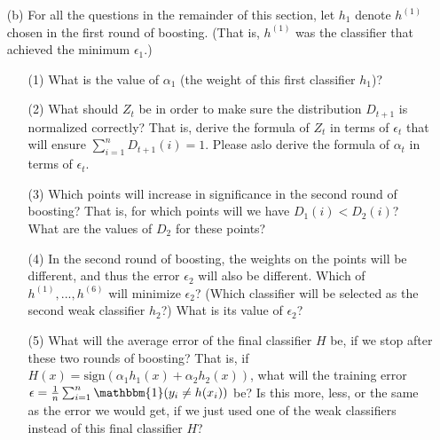 \documentclass[10pt]{article}
\begin{document}
\begin{enumerate}
\begin{itemize}
	        \item[(b)] For all the questions in the remainder of this section, let $h_{1}$ denote $h^{(1)}$ chosen in the first round of boosting. (That is, $h^{(1)}$ was the classifier that achieved the minimum $\epsilon_{1}$.)
		        \begin{enumerate}
			        \item[(1)] What is the value of $\alpha_{1}$ (the weight of this first classifier $h_{1}$)? ~\\

			        \item[(2)] What should $Z_{t}$ be in order to make sure the distribution $D_{t+1}$ is normalized correctly? That is, derive the formula of $Z_{t}$ in terms of $\epsilon_{t}$ that will ensure $\sum_{i=1}^{n} D_{t+1}(i) = 1$. Please aslo derive the formula of $\alpha_{t}$ in terms of $\epsilon_{t}$. ~\\

			        \item[(3)] Which points will increase in significance in the second round of boosting? That is, for which points will we have $D_{1}(i) < D_{2}(i)$? What are the values of $D_{2}$ for these points?~\\

			        \item[(4)] In the second round of boosting, the weights on the points will be different, and thus the error $\epsilon_2$ will also be different. Which of $h^{(1)}, . . . , h^{(6)}$ will minimize $\epsilon_2$? (Which classifier will be selected as the second weak classifier $h_2$?) What is its value of $\epsilon_2$?~\\

			        \item[(5)] What will the average error of the final classifier $H$ be, if we stop after these two rounds of boosting? That is, if $H(x) = \text{sign}(\alpha_{1}h_{1}(x) + \alpha_{2}h_{2}(x))$, what will the  training error $\epsilon = \frac{1}{n} \sum_{i=1}^{n} \mathbbm{1} (y_{i} \neq h(x_{i}))$ be? Is this more, less, or the same as the error we would get, if we just used one of the weak classifiers instead of this final classifier $H$?~\\

		        \end{enumerate}
        \end{itemize}

        \newpage


\end{enumerate}
\end{document}
